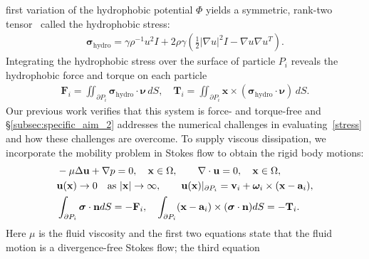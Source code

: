 first variation of the hydrophobic potential $\Phi$ yields a symmetric,
rank-two tensor~\cite{Bandle2015, Schiffer1954, Grinfeld2010} called the
hydrophobic stress:
\begin{align}
  \label{stress}
\boldsymbol{\sigma}_{\text{hydro}} = \gamma \rho^{-1} u^2 I + 2\rho \gamma (\tfrac{1}{2}|\nabla u|^2I - \nabla u \nabla u^T).
\end{align}
%
%
Integrating the hydrophobic stress over the surface of particle $P_i$
reveals the hydrophobic force and torque on each particle 
\begin{align}
  \label{forceandtorque}
  \mathbf{F}_i = \iint_{\partial P_i} \boldsymbol{\sigma}_{\text{hydro}}
  \cdot \boldsymbol{\nu} \,dS,\quad
  \mathbf{T}_i = \iint_{\partial P_i} \mathbf{x} \times
  (\boldsymbol{\sigma}_{\text{hydro}} \cdot \boldsymbol{\nu}) \,dS.
\end{align}
Our previous work verifies that this system is force- and torque-free
and \S\ref{subsec:specific_aim_2} addresses the numerical challenges in
evaluating~\eqref{stress} and how these challenges are overcome. To
supply viscous dissipation, we incorporate the mobility problem in
Stokes flow to obtain the rigid body motions:
\begin{equation}
\label{eq:stokes}
\begin{aligned}
  &-\mu \Delta \mathbf{u} + \nabla p = 0, \quad \mathbf{x} \in \Omega, \qquad 
  \nabla \cdot \mathbf{u} = 0,  \quad \mathbf{x} \in \Omega,\\
  &{\bf u}(\mathbf{x}) \to 0 \quad \text{as}\ |\mathbf{x}|\to \infty,\qquad 
  \mathbf{u}(\mathbf{x})|_{\partial P_i} = \mathbf{v}_i +
\boldsymbol{\omega}_i\times(\mathbf{x} - \mathbf{a}_i),\\
&\int_{\partial P_i}\boldsymbol{\sigma}\cdot {\bf n} dS=-{\bf F}_i, \quad
\int_{\partial P_i}(\mathbf{x}-\mathbf{a}_i)\times (\boldsymbol{\sigma} \cdot \mathbf{n}) dS=-{\bf T}_i.
\end{aligned}
\end{equation}
Here $\mu$ is the fluid viscosity and the first two equations state that
the fluid motion is a divergence-free Stokes flow; the third equation
